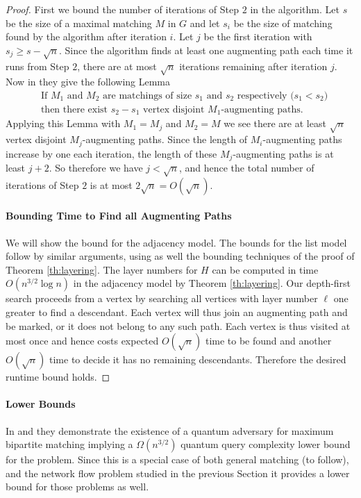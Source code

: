 \begin{proof}
First we bound the number of iterations of Step $2$ in the algorithm. Let $s$ be the size of a maximal matching $M$ in $G$ and let $s_i$ be the size of matching found by the algorithm after iteration $i$.  Let $j$ be the first iteration with $s_j \geq s-\sqrt{n}$. Since the algorithm finds at least one augmenting path each time it runs from Step $2$, there are at most $\sqrt{n}$ iterations remaining after iteration $j$.  Now in \cite{hopkroft1973n5} they give the following Lemma
\begin{align*}&\text{If $M_1$ and $M_2$ are matchings of size $s_1$ and $s_2$ respectively ($s_1 < s_2$)}\\&\text{then there exist $s_2-s_1$ vertex disjoint $M_1$-augmenting paths.}\end{align*}
Applying this Lemma with $M_1 = M_j$ and $M_2 = M$ we see there are at least $\sqrt{n}$ vertex disjoint $M_j$-augmenting paths. Since the length of $M_i$-augmenting paths increase by one each iteration, the length of these $M_j$-augmenting paths is at least $j+2$. So therefore we have $j <\sqrt{n}$, and hence the total number of iterations of Step $2$ is at most $2\sqrt{n} = O(\sqrt{n})$.
\paragraph{Bounding Time to Find all Augmenting Paths}
We will show the bound for the adjacency model. The bounds for the list model follow by similar arguments, using as well the bounding techniques of the proof of Theorem \ref{th:layering}. The layer numbers for $H$ can be computed in time $O(n^{3/2}\log n)$ in the adjacency model by Theorem \ref{th:layering}. Our depth-first search proceeds from a vertex by searching all vertices with layer number $\ell$ one greater to find a descendant. Each vertex will thus join an augmenting path and be marked, or it does not belong to any such path. Each vertex is thus visited at most once and hence costs expected $O(\sqrt{n})$ time to be found and another $O(\sqrt{n})$ time to decide it has no remaining descendants. Therefore the desired runtime bound holds.
\end{proof}
\bigskip
\paragraph{Lower Bounds}
In \cite{boyer1996tight} and \cite{zhang2005power} they demonstrate the existence of a quantum adversary for maximum bipartite matching implying a $\Omega(n^{3/2})$ quantum query complexity lower bound for the problem. Since this is a special case of both general matching (to follow), and the network flow problem studied in the previous Section it provides a lower bound for those problems as well.
